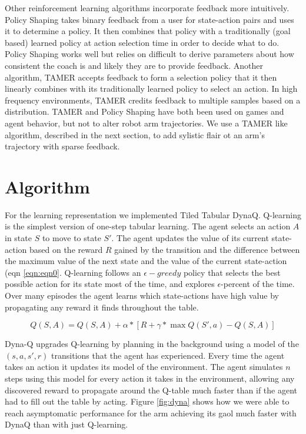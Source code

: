 \documentclass{article}
\begin{document}
Other reinforcement learning algorithms incorporate feedback more intuitively. Policy Shaping \cite{griffith_policy_2013} takes binary feedback from a user for state-action pairs and uses it to determine a policy. It then combines that policy with a traditionally (goal based) learned policy at action selection time in order to decide what to do. Policy Shaping works well but relies on difficult to derive parameters about how consistent the coach is and likely they are to provide feedback. Another algorithm, TAMER \cite{knox_reinforcement_2012} accepts feedback to form a selection policy that it then linearly combines with its traditionally learned policy to select an action. In high frequency environments, TAMER credits feedback to multiple samples based on a distribution. TAMER and Policy Shaping have both been used on games and agent behavior, but not to alter robot arm trajectories. We use a TAMER like algorithm, described in the next section, to add sylistic flair ot an arm's trajectory with sparse feedback.

\section{Algorithm}
For the learning representation we implemented Tiled Tabular DynaQ. Q-learning is the simplest version of one-step tabular learning. The agent selects an action $A$ in state $S$ to move to state $S'$. The agent updates the value of its current state-action based on the reward $R$ gained by the transition and the difference between the maximum value of the next state and the value of the current state-action (eqn \ref{eqn:eqn0}. Q-learning follows an $\epsilon-greedy$ policy that selects the best possible action for its state most of the time, and explores $\epsilon$-percent of the time. Over many episodes the agent learns which state-actions have high value by propagating any reward it finds throughout the table.

\begin{equation}\label{eqn:eqn0}
    Q(S,A) = Q(S,A) + \alpha * [R + \gamma * \max Q(S',a) - Q(S,A)]
\end{equation}

Dyna-Q \cite{sutton_introduction_1998} upgrades Q-learning by planning in the background using a model of the $(s,a,s',r)$ transitions that the agent has experienced. Every time the agent takes an action it updates its model of the environment. The agent simulates $n$ steps using this model for every action it takes in the environment, allowing any discovered reward to propagate around the Q-table much faster than if the agent had to fill out the table by acting. Figure \ref{fig:dyna} shows how we were able to reach asymptomatic performance for the arm achieving its gaol much faster with DynaQ than with just Q-learning.
\end{document}
